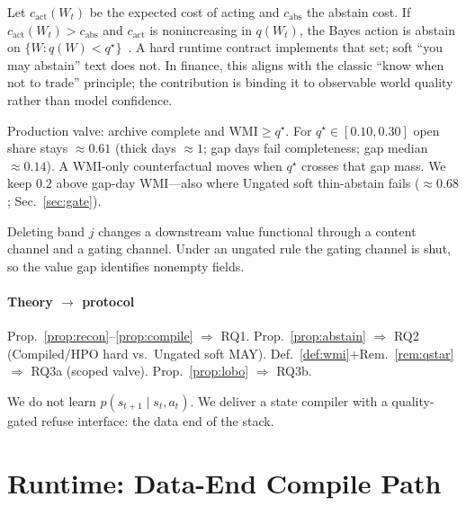 \documentclass[sigconf,anonymous]{acmart}
\theoremstyle{acmdefinition}%
\theoremstyle{acmplain}%
\begin{document}
\begin{proposition}
\label{prop:abstain}
Let \(c_{\mathrm{act}}(W_t)\) be the expected cost of acting and \(c_{\mathrm{abs}}\) the abstain cost.
If \(c_{\mathrm{act}}(W_t)>c_{\mathrm{abs}}\) and \(c_{\mathrm{act}}\) is nonincreasing in \(q(W_t)\),
the Bayes action is abstain on \(\{W:q(W)<q^\star\}\)~\cite{elyaniv2010}.
A hard runtime contract implements that set; soft ``you may abstain'' text does not.
In finance, this aligns with the classic ``know when not to trade'' principle; the contribution is binding it to observable world quality rather than model confidence.
\end{proposition}
\begin{remark}[Threshold \(q^\star=0.2\)]
\label{rem:qstar}
Production valve: archive complete and \(\mathrm{WMI}\ge q^\star\).
For \(q^\star\in[0.10,0.30]\) open share stays \({\approx}0.61\) (thick days \(\approx 1\); gap days fail completeness; gap median \({\approx}0.14\)).
A WMI-only counterfactual moves when \(q^\star\) crosses that gap mass.
We keep \(0.2\) above gap-day WMI---also where Ungated soft thin-abstain fails (\({\approx}0.68\); Sec.~\ref{sec:gate}).
\end{remark}

\begin{proposition}
\label{prop:lobo}
Deleting band \(j\) changes a downstream value functional through a content channel and a gating channel.
Under an ungated rule the gating channel is shut, so the value gap identifies nonempty fields.
\end{proposition}

\paragraph{Theory \(\rightarrow\) protocol}
Prop.~\ref{prop:recon}--\ref{prop:compile} \(\Rightarrow\) RQ1.
Prop.~\ref{prop:abstain} \(\Rightarrow\) RQ2 (Compiled/HPO hard vs.\ Ungated soft MAY).
Def.~\ref{def:wmi}+Rem.~\ref{rem:qstar} \(\Rightarrow\) RQ3a (scoped valve).
Prop.~\ref{prop:lobo} \(\Rightarrow\) RQ3b.

\begin{remark}
We do not learn \(p(s_{t+1}\mid s_t,a_t)\).
We deliver a state compiler with a quality-gated refuse interface: the data end of the stack.
\end{remark}

\section{Runtime: Data-End Compile Path}
\label{sec:system}
\end{document}
